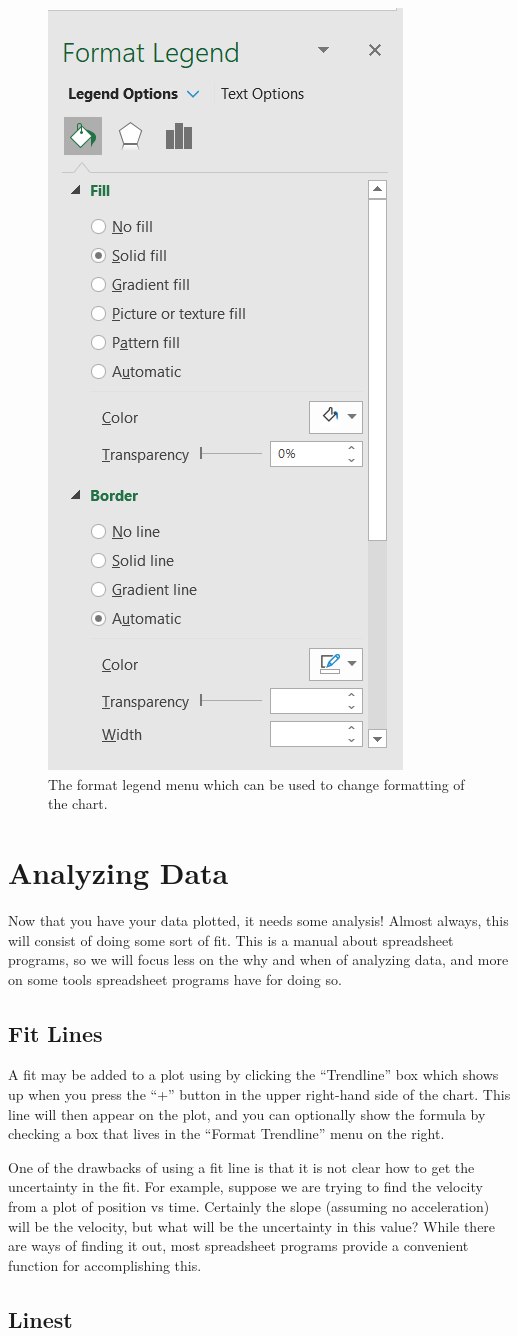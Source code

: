 \documentclass[10pt]{article}
\begin{document}
\begin{figure}[htpb]
	\centering
	\includegraphics[width=0.2\linewidth]{images/format-legend.png}
	\caption{The format legend menu which can be used to change formatting of the chart.}%
	\label{fig:images_format-legend}
\end{figure}


\section{Analyzing Data}%
\label{sec:analyzing_data}

Now that you have your data plotted, it needs some analysis! Almost always, this will consist of doing some sort of fit.
This is a manual about spreadsheet programs, so we will focus less on the why and when of analyzing data, and more on some tools spreadsheet programs have for doing so. 

\subsection{Fit Lines}%
\label{sub:fit_lines}

A fit may be added to a plot using by clicking the ``Trendline'' box which shows up when you press the ``+'' button in the upper right-hand side of the chart.
This line will then appear on the plot, and you can optionally show the formula by checking a box that lives in the ``Format Trendline'' menu on the right. 

One of the drawbacks of using a fit line is that it is not clear how to get the uncertainty in the fit.
For example, suppose we are trying to find the velocity from a plot of position vs time.
Certainly the slope (assuming no acceleration) will be the velocity, but what will be the uncertainty in this value? While there are ways of finding it out, most spreadsheet programs provide a convenient function for accomplishing this.

\subsection{Linest}%
\label{sub:linest}
\end{document}
